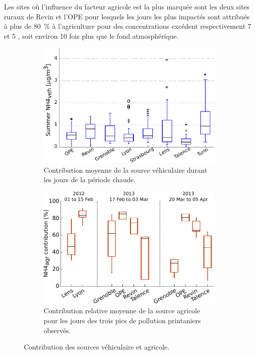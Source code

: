 Les sites où l'influence du facteur agricole est la plus marquée sont les deux sites
ruraux de Revin et l'OPE pour lesquels les jours les plus impactés sont attribués à plus
de \SI{80}{\percent} à l'agriculture pour des concentrations excédent respectivement 7 et 5
\si{\ugm}, soit environ 10 fois plus que le fond atmosphérique.

\begin{figure}[ht]
    \begin{subfigure}[t]{0.5\textwidth}
    \begin{center}
    \includegraphics[width=.9\textwidth]{figures/INACS/MCA_contribSummerVeh.pdf}
    \end{center}
    \caption{Contribution moyenne de la source véhiculaire durant les jours de la période chaude.}
    \label{fig:summerNH4}
    \end{subfigure}
    \begin{subfigure}[t]{0.5\textwidth}
    \begin{center}
    \includegraphics[width=.9\textwidth]{figures/INACS/MCA_contribSpringEventAgr.pdf}
    \end{center}
    \caption{Contribution relative moyenne de la source agricole pour les jours des trois
    pics de pollution printaniers observés.}
    \label{fig:contribSpringAgr}
    \end{subfigure}
    \caption{Contribution des sources véhiculaire et agricole.}
\end{figure}


